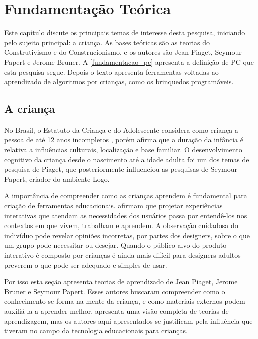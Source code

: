 \chapter{Fundamentação Teórica}
\label{c_fundamentacao_teorica}

{
Este capítulo discute os principais temas de interesse desta pesquisa, iniciando pelo sujeito principal: a criança. As bases teóricas são as teorias do Construtivismo e do Construcionismo, e os autores são Jean Piaget, Seymour Papert e Jerome Bruner. A \autoref{fundamentacao_pc} apresenta a definição de \ac{PC} que esta pesquisa segue. Depois o texto apresenta ferramentas voltadas ao aprendizado de algoritmos por crianças, como os brinquedos programáveis.
}

\section{A criança}
\label{fundamentacao_crianca}
No Brasil, o Estatuto da Criança e do Adolescente considera como criança a pessoa de até 12 anos incompletos \cite{brasil_lei_1990}, porém  afirma que a duração da infância é relativa a influências culturais, localização e base familiar. O desenvolvimento cognitivo da criança desde o nascimento até a idade adulta foi um dos temas de pesquisa de Piaget, que posteriormente influenciou as pesquisas de Seymour Papert, criador do ambiente Logo.

A importância de compreender como as crianças aprendem é fundamental para criação de ferramentas educacionais.  afirmam que projetar experiências interativas que atendam as necessidades dos usuários passa por entendê-los nos contextos em que vivem, trabalham e aprendem. A observação cuidadosa do indivíduo pode revelar opiniões incorretas, por partes dos designers, sobre o que um grupo pode necessitar ou desejar. Quando o público-alvo do produto interativo é composto por crianças é ainda mais difícil para designers adultos preverem o que pode ser adequado e simples de usar.

Por isso esta seção apresenta teorias de aprendizado de Jean Piaget, Jerome Bruner e Seymour Papert. Esses autores buscaram compreender como o conhecimento se forma na mente da criança, e como materiais externos podem auxiliá-la a aprender melhor.  apresenta uma visão completa de teorias de aprendizagem, mas os autores aqui apresentados se justificam pela influência que tiveram no campo da tecnologia educacionais para crianças.

